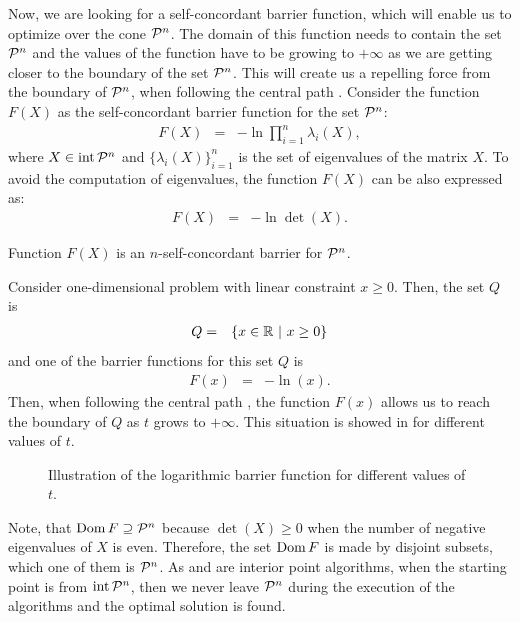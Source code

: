 Now, we are looking for a self-concordant barrier function, which will enable us to optimize over the cone $\mathcal{P}^n$.
The domain of this function needs to contain the set $\mathcal{P}^n$ and the values of the function have to be growing to $+\infty$ as we are getting closer to the boundary of the set $\mathcal{P}^n$.
This will create us a repelling force from the boundary of $\mathcal{P}^n$, when following the central path .
Consider the function $F(X)$ as the self-concordant barrier function for the set $\mathcal{P}^n$:
\begin{eqnarray}
  F(X) &=& -\ln\prod_{i=1}^{n}\lambda_i(X),
\end{eqnarray}
where $X\in\operatorname{int}\mathcal{P}^n$ and $\big\{\lambda_i(X)\big\}_{i=1}^n$ is the set of eigenvalues of the matrix $X$.
To avoid the computation of eigenvalues, the function $F(X)$ can be also expressed as:
\begin{eqnarray}
  F(X) &=& -\ln\det(X).
\end{eqnarray}

\begin{theorem}
  Function $F(X)$ is an $n$-self-concordant barrier for $\mathcal{P}^n$.
\end{theorem}

\begin{example}
  Consider one-dimensional problem with linear constraint $x \geq 0$.
  Then, the set $Q$ is
  \begin{eqnarray}
    Q &=& \{x\in\mathbb{R}\ |\ x \geq 0\}
  \end{eqnarray}
  and one of the barrier functions for this set $Q$ is
  \begin{eqnarray}
    F(x) &=& -\ln(x).
  \end{eqnarray}
  Then, when following the central path , the function $F(x)$ allows us to reach the boundary of $Q$ as $t$ grows to $+\infty$.
  This situation is showed in  for different values of $t$.

  \begin{figure}[ht]
    \centering
    \resizebox{0.95\textwidth}{!}{}
    \caption{Illustration of the logarithmic barrier function for different values of $t$.}
  \end{figure}
\end{example}

Note, that $\operatorname{Dom} F \supseteq \mathcal{P}^n$ because $\det(X) \geq 0$ when the number of negative eigenvalues of $X$ is even. Therefore, the set $\operatorname{Dom} F$ is made by disjoint subsets, which one of them is $\mathcal{P}^n$. As  and  are interior point algorithms, when the starting point is from $\operatorname{int}\mathcal{P}^n$, then we never leave $\mathcal{P}^n$ during the execution of the algorithms and the optimal solution is found.

